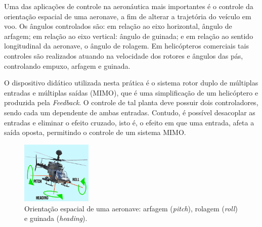 Uma das aplicações de controle na aeronáutica mais importantes é o controle da orientação espacial de uma aeronave, a fim de alterar a trajetória do veículo em voo. Os ângulos controlados são: em relação ao eixo horizontal, ângulo de arfagem; em relação ao eixo vertical: ângulo de guinada; e em relação ao sentido longitudinal da aeronave, o ângulo de rolagem. 
Em helicópteros comerciais tais controles são realizados atuando na velocidade dos rotores e ângulos das pás, controlando empuxo, arfagem e guinada.

O dispositivo didático utilizada nesta prática é o sistema rotor duplo de múltiplas entradas e múltiplas saídas (MIMO), que é uma simplificação de um helicóptero e produzida pela \textit{Feedback}. O controle de tal planta deve possuir dois controladores, sendo cada um dependente de ambas entradas. Contudo, é possível desacoplar as entradas e eliminar o efeito cruzado, isto é, o efeito em que uma entrada, afeta a saída oposta, permitindo o controle de um sistema MIMO.

\begin{figure}[H]
    \centering
    \includegraphics[width=0.30\textwidth]{figures/pitch-roll-heading.jpg}
    \caption{Orientação espacial de uma aeronave: arfagem (\textit{pitch}), rolagem (\textit{roll}) e guinada (\textit{heading}).}
    \label{fig:helicoptero}
\end{figure}
